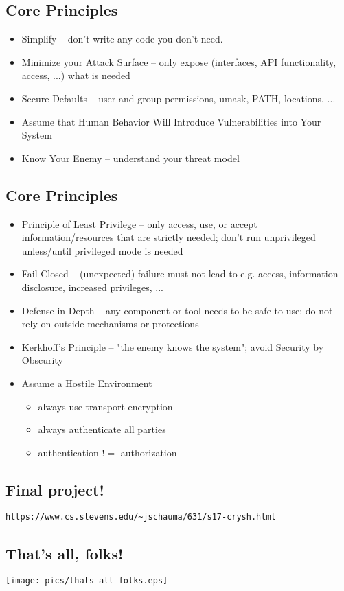 \documentclass[xga]{xdvislides}
\begin{document}
\subsection{Core Principles}

\begin{itemize}
	\item Simplify -- don't write any code you don't need.
	\item Minimize your Attack Surface -- only expose (interfaces, API functionality, access, ...) what is needed
	\item Secure Defaults -- user and group permissions,
		umask, PATH, locations, ...
	\item Assume that Human Behavior Will Introduce Vulnerabilities into Your System
	\item Know Your Enemy -- understand your threat model
\end{itemize}

\subsection{Core Principles}

\begin{itemize}
	\item Principle of Least Privilege -- only access, use, or accept
		information/resources that are strictly needed; don't run
		unprivileged unless/until privileged mode is needed
	\item Fail Closed -- (unexpected) failure must
		not lead to e.g. access, information disclosure,
		increased privileges, ...
	\item Defense in Depth -- any component or tool needs to be safe
		to use; do not rely on outside mechanisms or protections
	\item Kerkhoff's Principle -- "the enemy knows the system"; avoid Security by Obscurity
	\item Assume a Hostile Environment
		\begin{itemize}
			\item always use transport encryption
			\item always authenticate all parties
			\item authentication $!=$ authorization
		\end{itemize}
\end{itemize}

\subsection{Final project!}

\verb+https://www.cs.stevens.edu/~jschauma/631/s17-crysh.html+

\subsection{That's all, folks!}

\begin{center}
	\texttt{[image: pics/thats-all-folks.eps]}
\end{center}
\end{document}
